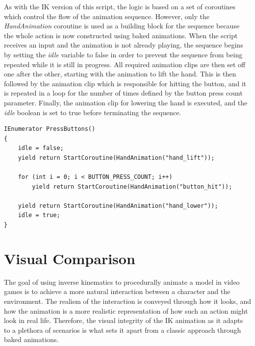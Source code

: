 As with the IK version of this script, the logic is based on a set of coroutines
which control the flow of the animation sequence. However, only the
\textit{HandAnimation} coroutine is used as a building block for the sequence
because the whole action is now constructed using baked animations. When the
script receives an input and the animation is not already playing, the sequence
begins by setting the \textit{idle} variable to false in order to prevent the sequence
from being repeated while it is still in progress. All required animation clips
are then set off one after the other, starting with the animation to lift the
hand. This is then followed by the animation clip which is responsible for
hitting the button, and it is repeated in a loop for the number of times defined
by the button press count parameter. Finally, the animation clip for lowering
the hand is executed, and the \textit{idle} boolean is set to true before
terminating the sequence.

\begin{lstlisting}[basicstyle=\linespread{0.9}\footnotesize\ttfamily, numbers=none,frame=single,
caption={The main coroutine which plays the full animation sequence for the
baked version of the human character. The \textit{HandAnimation} coroutine is
analogous to the one used for the IK character in Listing \ref{first_coroutine}.
\textit{PressButton.cs}},captionpos=b, label=set_float,
language={[Sharp]c}, float=tp]
IEnumerator PressButtons()
{
    idle = false;
    yield return StartCoroutine(HandAnimation("hand_lift"));
    
    for (int i = 0; i < BUTTON_PRESS_COUNT; i++)
        yield return StartCoroutine(HandAnimation("button_hit"));
    
    yield return StartCoroutine(HandAnimation("hand_lower"));
    idle = true;
}
\end{lstlisting}

\section{Visual Comparison}
The goal of using inverse kinematics to procedurally animate a model in video
games is to achieve a more natural interaction between a character and the
environment. The realism of the interaction is conveyed through how it looks,
and how the animation is a more realistic representation of how such an action
might look in real life. Therefore, the visual integrity of the IK animation as
it adapts to a plethora of scenarios is what sets it apart from a classic
approach through baked animations. 

